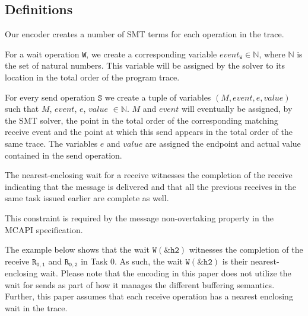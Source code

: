 \subsection{Definitions}

Our encoder creates a number of SMT terms for each operation in the
trace.

\begin{definition}[Wait]
For a wait operation \texttt{W}, we create a corresponding variable
$\mathit{event}_\mathtt{W} \in \mathbb{N}$, where $\mathbb{N}$ is the
set of natural numbers. This variable will be assigned by the solver
to its location in the total order of the program trace.
\label{def:event}
\end{definition}

\begin{definition}[Send]
For every send operation $\mathtt{S}$ we create a tuple of variables
$(M,\mathit{event}, e,\mathit{value})$ such that $\mathit{M}$,
$\mathit{event}$, $\mathit{e}$, $\mathit{value}$ $ \in
\mathbb{N}$. $M$ and $\mathit{event}$ will eventually be assigned, by
the SMT solver, the point in the total order of the corresponding
matching receive event and the point at which this send appears in the
total order of the same trace. The variables $e$ and $\mathit{value}$
are assigned the endpoint and actual value contained in the send
operation.
\label{def:snd}
\end{definition}

\begin{definition}
The nearest-enclosing wait for a receive witnesses the completion of
the receive indicating that the message is delivered and that all the
previous receives in the same task issued earlier are complete as
well.
\label{def:nw}
\end{definition}

This constraint is required by the message non-overtaking property in
the MCAPI specification. 

The example below shows that the wait $\mathtt{W{(\&h2)}}$ witnesses
the completion of the receive $\mathtt{R_{0,1}}$ and
$\mathtt{R_{0,2}}$ in Task 0. As such, the wait $\mathtt{W{(\&h2)}}$
is their nearest-enclosing wait. Please note that the encoding in this
paper does not utilize the wait for sends as part of how it manages
the different buffering semantics. Further, this paper assumes that
each receive operation has a nearest enclosing wait in the trace.

